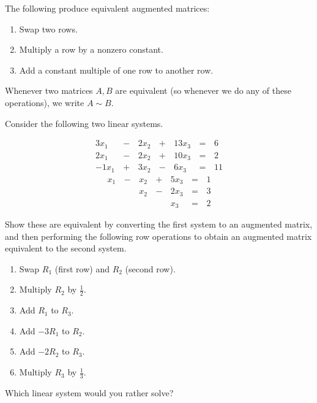 


\begin{applicationActivities}{2}{4}

\begin{definition}
  The following  produce equivalent
  augmented matrices:
  \begin{enumerate}
    \item Swap two rows.
    \item Multiply a row by a nonzero constant.
    \item Add a constant multiple of one row to another row.
  \end{enumerate}
  Whenever two matrices \(A,B\) are equivalent (so whenever we do any of
  these operations), we write \(A\sim B\).
\end{definition}

\begin{activity}{10}
  Consider the following two linear systems.
  \begin{multicols}{2}\noindent
    \begin{alignat*}{4}
      3x_1 &\,-\,& 2x_2 &\,+\,& 13x_3 &\,=\,& 6 \\
      2x_1 &\,-\,& 2x_2 &\,+\,& 10x_3 &\,=\,& 2 \\
     -1x_1 &\,+\,& 3x_2 &\,-\,&  6x_3 &\,=\,& 11
    \end{alignat*}
    \begin{alignat*}{4}
       x_1 &\,-\,&  x_2  &\,+\,&  5x_3 &\,=\,& 1 \\
           &\, \,&  x_2 &\,-\,&  2x_3 &\,=\,& 3 \\
           &\, \,&      &\, \,&   x_3 &\,=\,& 2
    \end{alignat*}
  \end{multicols}
  \begin{subactivity}
    Show these are equivalent by converting the first system to an augmented
    matrix, and then performing the following row operations to obtain
    an augmented matrix equivalent to the second system.
    \begin{multicols}{2}\noindent
    \begin{enumerate}
      \item Swap \(R_1\) (first row) and \(R_2\) (second row).
      \item Multiply \(R_2\) by \(\frac{1}{2}\).
      \item Add \(R_1\) to \(R_3\).
      \item Add \(-3R_1\) to \(R_2\).
      \item Add \(-2R_2\) to \(R_3\).
      \item Multiply \(R_3\) by \(\frac{1}{3}\).
    \end{enumerate}
    \end{multicols}
  \end{subactivity}
  \begin{subactivity}
    Which linear system would you rather solve?
  \end{subactivity}
\end{activity}


\end{applicationActivities}
